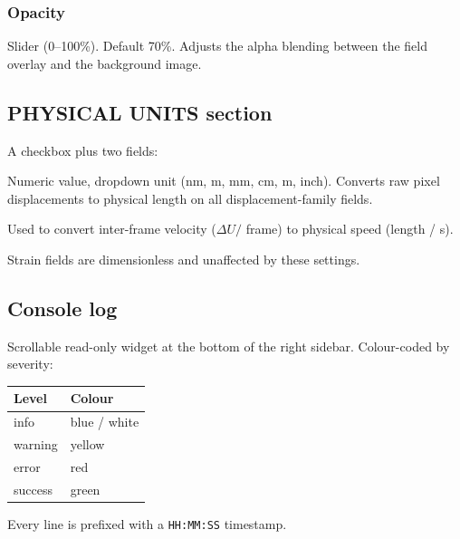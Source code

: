 \subsubsection*{Opacity}

Slider (0--100\%). Default 70\%. Adjusts the alpha blending between
the field overlay and the background image.

\subsection{PHYSICAL UNITS section}

A checkbox plus two fields:

\begin{description}[leftmargin=1.2cm,style=nextline]
  \item[Pixel Size]
    Numeric value, dropdown unit (nm, \textmu m, mm, cm, m, inch).
    Converts raw pixel displacements to physical length on all
    displacement-family fields.
  \item[Frame Rate]
    Used to convert inter-frame velocity ($\Delta U / $ frame) to
    physical speed (length / s).
\end{description}

Strain fields are dimensionless and unaffected by these settings.

\subsection{Console log}

Scrollable read-only widget at the bottom of the right sidebar.
Colour-coded by severity:

\begin{center}
\begin{tabular}{ll}
  \toprule
  Level & Colour \\
  \midrule
  info     & blue / white \\
  warning  & yellow       \\
  error    & red          \\
  success  & green        \\
  \bottomrule
\end{tabular}
\end{center}

Every line is prefixed with a \texttt{HH:MM:SS} timestamp.
